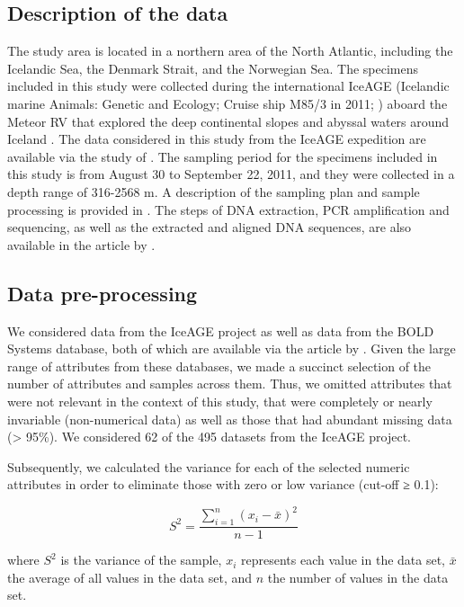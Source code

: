 \subsection{Description of the data}
The study area is located in a northern area of the North Atlantic, including the Icelandic Sea, the Denmark Strait, and the Norwegian Sea. The specimens included in this study were collected during the international IceAGE (Icelandic marine Animals: Genetic and Ecology; Cruise ship M85/3 in 2011; \citep{meisner_prefacebiodiversity_2018}) aboard the Meteor RV that explored the deep continental slopes and abyssal waters around Iceland \citep{meisner_prefacebiodiversity_2018}. The data considered in this study from the IceAGE expedition are available via the study of \cite{uhlir_adding_2021}. The sampling period for the specimens included in this study is from August 30 to September 22, 2011, and they were collected in a depth range of 316-2568 m. A description of the sampling plan and sample processing is provided in \cite{uhlir_adding_2021}. The steps of DNA extraction, PCR amplification and sequencing, as well as the extracted and aligned DNA sequences, are also available in the article by \cite{uhlir_adding_2021}.

\subsection{Data pre-processing}
We considered data from the IceAGE project as well as data from the BOLD Systems database, both of which are available via the article by \cite{uhlir_adding_2021}. Given the large range of attributes from these databases, we made a succinct selection of the number of attributes and samples across them. Thus, we omitted attributes that were not relevant in the context of this study, that were completely or nearly invariable (non-numerical data) as well as those that had abundant missing data (> 95\%). We considered 62 of the 495 datasets from the IceAGE project.

Subsequently, we calculated the variance for each of the selected numeric attributes in order to eliminate those with zero or low variance (cut-off ≥ 0.1):

\begin{equation}
S^2 = \frac{\sum_{i=1}^{n} (x_i - \bar{x})^2}{n-1}
\end{equation}

where \( S^2 \) is the variance of the sample, \( x_i \) represents each value in the data set, \( \bar{x} \) the average of all values in the data set, and \( n \) the number of values in the data set.

